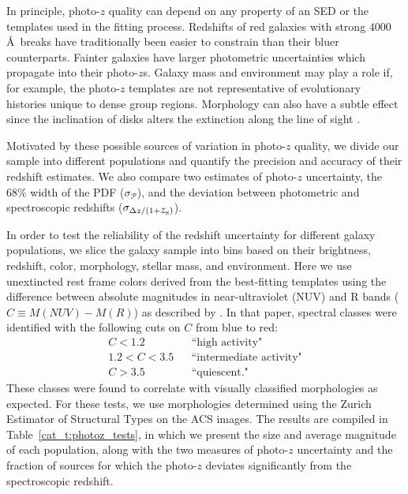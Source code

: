 In principle, photo-$z$ quality can depend on any property of an SED or the
templates used in the fitting process. Redshifts of red galaxies with strong
$4000$\AA\ breaks have traditionally been easier to constrain than their
bluer counterparts. Fainter galaxies have larger photometric
uncertainties which propagate into their photo-$z$s. Galaxy mass and
environment may play a role if, for example, the photo-$z$ templates are
not representative of evolutionary histories unique to dense group
regions. Morphology can also have a subtle effect since the
inclination of disks alters the extinction along the line of sight
\citep{Yip2011}. 

Motivated by these possible sources of variation in
photo-$z$ quality, we divide our sample into different populations and
quantify the precision and accuracy of their redshift estimates.
We also compare two estimates of photo-$z$ uncertainty, the $68\%$ width
of the PDF ($\sigma_{\mathcal{P}}$), and the deviation between
photometric and spectroscopic redshifts ($\sigma_{\Delta z/(1+\mbox{$z_{\rm s}$})}$).

In order to test the reliability of the redshift uncertainty
for different galaxy populations, we
slice the galaxy sample into bins based on their 
brightness, redshift, color, morphology, stellar mass, and
environment. Here we use unextincted rest frame
colors derived from the best-fitting templates using the
difference between absolute magnitudes in near-ultraviolet (NUV) and R
bands ($C \equiv M(NUV)-M(R)$) as described by \citet{Ilbert2010}. In
that paper, spectral classes were identified with the following cuts
on $C$ from blue to red:
\begin{eqnarray} 
C < 1.2 & &\textrm{``high activity"} \nonumber \\
1.2 < C < 3.5 & &\textrm{``intermediate activity"} \nonumber \\
C > 3.5 & &\textrm{``quiescent."} \nonumber
\end{eqnarray}
These classes were found to correlate with visually classified
morphologies as expected. For these tests, we use
morphologies determined using the Zurich Estimator of Structural Types
\citep[ZEST; ][]{Scarlata2007} on the ACS images. The results are compiled in
Table~\ref{cat_t:photoz_tests}, in which we present the size and average
magnitude of each population, along with the two measures of photo-$z$
uncertainty and the fraction of sources for which the photo-$z$ deviates
significantly from the spectroscopic redshift.

